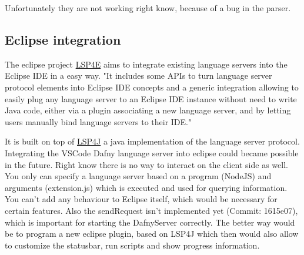 Unfortunately they are not working right know, because of a bug in the parser.


\subsection{Eclipse integration}
The eclipse project \href{https://projects.eclipse.org/projects/technology.lsp4e}{LSP4E} aims to integrate existing language servers into the Eclipse IDE in a easy way. 
\newline
"It includes some APIs to turn language server protocol elements into Eclipse IDE concepts and a generic integration allowing to easily plug any language server to an Eclipse IDE instance without need to write Java code, either via a plugin associating a new language server, and by letting users manually bind language servers to their IDE." \cite{lsp4e}

It is built on top of \href{https://github.com/eclipse/lsp4j}{LSP4J} a java implementation of the language server protocol. 
\newline
Integrating the VSCode Dafny language server into eclipse could became possible in the future. Right know there is no way to interact on the client side as well. You only can specify a language server based on a program (NodeJS) and arguments (extension.js) which is executed and used for querying information. You can't add any behaviour to Eclipse itself, which would be necessary for certain features. Also the sendRequest isn't implemented yet (Commit: 1615e07), which is important for starting the DafnyServer correctly. 
The better way would be to program a new eclipse plugin, based on LSP4J which then would also allow to customize the statusbar, run scripts and show progress information. 




